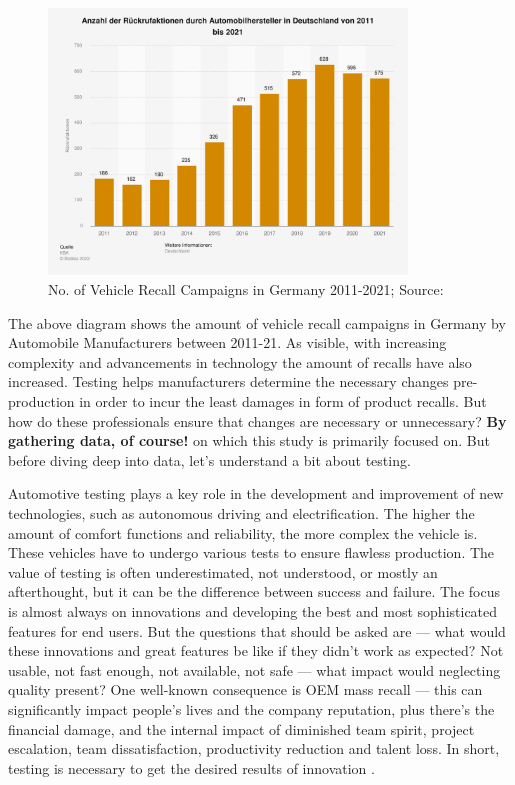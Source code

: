 \begin{figure}[H]
    	\centering
    	\includegraphics[width= 0.85\textwidth]{images/statistic_id1254342_rueckrufaktionen-in-der-automobilindustrie-in-deutschland-bis-2021.pdf}
    	\caption [Vehicle Recall Data]{ No. of Vehicle Recall Campaigns in Germany 2011-2021; Source: \protect\cite{KBA}}  
    	\label{fig:Statista Data}
\end{figure}
\newpage
The above diagram shows the amount of vehicle recall campaigns in Germany by Automobile Manufacturers between 2011-21. As visible, with increasing complexity and advancements in technology the amount of recalls have also increased. Testing helps manufacturers determine the necessary changes pre-production in order to incur the least damages in form of product recalls. But how do these professionals ensure that changes are necessary or unnecessary?
\textbf{By gathering data, of course!} on which this study is primarily focused on. But before diving deep into data, let's understand a bit about testing. 

Automotive testing plays a key role in the development and improvement of new technologies, such as autonomous driving and electrification. The higher the amount of comfort functions and reliability, the more complex the vehicle is. These vehicles have to undergo various tests to ensure flawless production. The value of testing is often underestimated, not understood, or mostly an afterthought, but it can be the difference between success and failure. The focus is almost always on innovations and developing the best and most sophisticated features for end users. But the questions that should be asked are  — what would these innovations and great features be like if they didn't work as expected? Not usable, not fast enough, not available, not safe — what impact would neglecting quality present? One well-known consequence is OEM mass recall — this can significantly impact people’s lives and the company reputation, plus there’s the financial damage, and the internal impact of diminished team spirit, project escalation, team dissatisfaction, productivity reduction and talent loss. In short, testing is necessary to get the desired results of innovation \cite{luxoft}.

